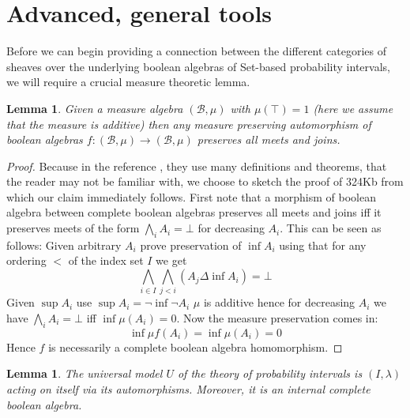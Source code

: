 \documentclass[a4paper]{amsproc}
\theoremstyle{plain}
\newtheorem{lemma}[theorem]{Lemma}
\theoremstyle{definition}
\theoremstyle{remark}
\numberwithin{equation}{section}
\begin{document}
\section{Advanced, general tools}
Before we can begin providing a connection between the different categories of sheaves over the underlying boolean algebras of Set-based probability intervals, we will require a crucial measure theoretic lemma.
\begin{lemma} Given a measure algebra $(\mathcal{B},\mu)$ with $\mu(\top)=1$ (here we assume that the measure is additive) then any measure preserving automorphism of boolean algebras $f:(\mathcal{B},\mu)\rightarrow (\mathcal{B},\mu)$ preserves all meets and joins.
\end{lemma}
\begin{proof} Because in the reference \cite{fremlin}, they use many definitions and theorems, that the reader may not be familiar with, we choose to sketch the proof of 324Kb from which our claim immediately follows.\newline
\indent First note that a morphism of boolean algebra between complete boolean algebras preserves all meets and joins iff it preserves meets of the form $\bigwedge_i A_i=\bot$ for decreasing $A_i$. This can be seen as follows:\newline 
\indent  Given arbitrary $A_i$ prove preservation of $\inf A_i$ using that for any ordering $<$ of the index set $I$ we get
\[\bigwedge_{i\in I} \bigwedge_{j<i} (A_j \Delta \inf A_i)=\bot\] %
\indent Given $\sup A_i$ use $\sup A_i=\neg \inf \neg A_i$\newline
$\mu$ is additive hence for decreasing $A_i$ we have $\bigwedge_i A_i=\bot$ iff $\inf \mu(A_i)=0$. Now the measure preservation comes in:
\[ \inf \mu f(A_i)=\inf \mu(A_i)=0\]
Hence $f$ is necessarily a complete boolean algebra homomorphism.
\end{proof}
\begin{lemma} The universal model $U$ of the theory of probability intervals is $(I,\lambda)$ acting on itself via its automorphisms. Moreover, it is an internal complete boolean algebra.
\end{lemma}
\end{document}
